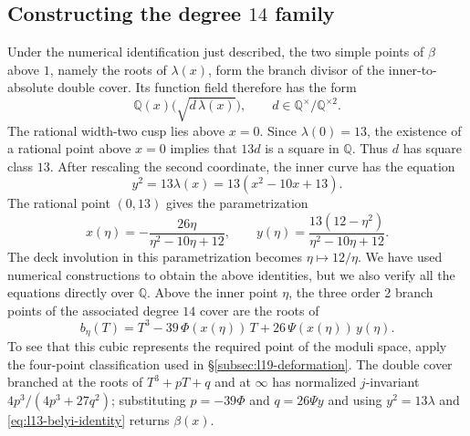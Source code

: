 \documentclass[10pt]{amsart}
\numberwithin{equation}{section}
\theoremstyle{definition}
\theoremstyle{remark}
\newcommand{\Q}{\mathbb{Q}}
\begin{document}
\subsection{Constructing the degree \texorpdfstring{$14$}{14}
family}
  Under the numerical identification just described, the two simple points of $\beta$ above $1$, namely the roots of
  $\lambda(x)$, form the branch divisor of the inner-to-absolute double cover.
  Its function field therefore has the form
  \[
   \Q(x)\bigl(\sqrt{d\,\lambda(x)}\bigr),
   \qquad d\in\Q^\times/\Q^{\times2}.
  \]
  The rational width-two cusp lies above $x=0$. Since $\lambda(0)=13$, the
  existence of a rational point above $x=0$ implies that $13d$ is a square in
  $\Q$. Thus \(d\) has square class \(13\). After rescaling the second
  coordinate, the inner curve has the equation
  \[
   y^2=13\lambda(x)=13(x^2-10x+13).
  \]
  The rational point $(0,13)$ gives the parametrization
\[
 x(\eta)=-\frac{26\eta}{\eta^2-10\eta+12},
 \qquad
 y(\eta)=\frac{13(12-\eta^2)}{\eta^2-10\eta+12}.    
\]
The deck involution in this parametrization becomes $\eta\mapsto12/\eta$.  We have used numerical constructions to obtain the above identities, but we also verify all the equations directly over $\Q$.  Above the inner point
$\eta$, the three order 2 branch points of the associated degree $14$
cover are the roots of
\[
 b_\eta(T)=T^3-39\,\Phi(x(\eta))\,T+26\,\Psi(x(\eta))\,y(\eta) .
\]
To see that this cubic represents the required point of the moduli space,
apply the four-point classification used in \S\ref{subsec:l19-deformation}.
The double cover branched at the roots of $T^3+pT+q$ and at $\infty$ has
normalized $j$-invariant $4p^3/(4p^3+27q^2)$; substituting
$p=-39\Phi$ and $q=26\Psi y$ and using $y^2=13\lambda$ and
\eqref{eq:l13-belyi-identity} returns $\beta(x)$. 
\end{document}
